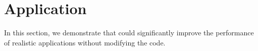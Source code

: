 \section{Application}
\label{sec:application}

In this section, we demonstrate that \sys{} could significantly improve the performance of realistic applications without modifying the code.
\begin{figure}[t!]
	\centering
	\begin{minipage}{.31\textwidth}
		

\end{minipage}
\end{figure}
